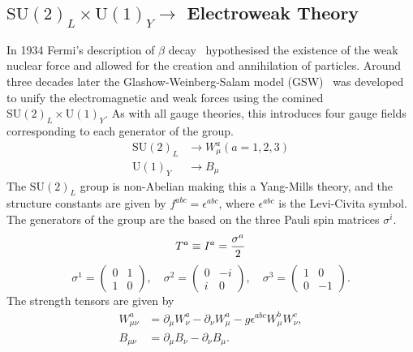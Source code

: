 \subsection{\texorpdfstring{$\text{SU}(2)_L \times \text{U}(1)_Y \rightarrow$}{SU(2)xSU(1)-} Electroweak Theory}
\label{sec:electroweak}

In 1934 Fermi's description of $\beta$ decay~\cite{Fermi1934} hypothesised the existence of the weak nuclear force and allowed for the creation and annihilation of particles.
Around three decades later the Glashow-Weinberg-Salam model (GSW)~\cite{Glashow1961, Weinberg1967,Salam1964} was developed to unify the electromagnetic and weak forces using the comined $\text{SU}(2)_L \times \text{U}(1)_Y$.
As with all gauge theories, this introduces four gauge fields corresponding to each generator of the group.
\begin{align}
	\text{SU}(2)_L & \rightarrow W_\mu^a(a = 1, 2, 3) \\
	\text{U}(1)_Y  & \rightarrow B_\mu
\end{align}
The $\text{SU}(2)_L$ group is non-Abelian making this a Yang-Mills theory, and the structure constants are given by $f^{abc} = \epsilon^{abc}$, where $\epsilon^{abc}$ is the Levi-Civita symbol.
The generators of the group are the based on the three Pauli spin matrices $\sigma^i$.
\begin{equation}
	\label{eq:su2_generators}
	T^a \equiv I^a = \frac{\sigma^a}{2} \\
\end{equation}
\begin{equation}
	\sigma^1 = \begin{pmatrix} 0 & 1 \\ 1 & 0 \end{pmatrix},
	\quad \sigma^2 = \begin{pmatrix} 0 & -i \\ i & 0 \end{pmatrix},
	\quad \sigma^3 = \begin{pmatrix} 1 & 0 \\ 0 & -1 \end{pmatrix}.
	\label{eq:pauli_matrices}
\end{equation}
The strength tensors are given by
\begin{align}
	\label{eq:ew_field_strength_tensors}
	W_{\mu\nu}^a & = \partial_\mu W_\nu^a - \partial_\nu W_\mu^a - g \epsilon^{abc} W_\mu^b W_\nu^c, \\
	B_{\mu\nu}   & = \partial_\mu B_\nu - \partial_\nu B_\mu.
\end{align}
